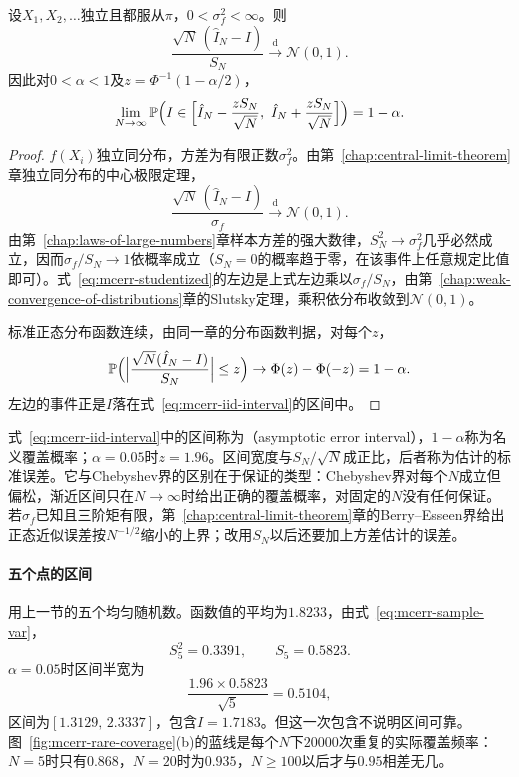 \begin{theorem}[独立样本的渐近误差区间]
\label{thm:mcerr-iid-clt}
设$X_1,X_2,\dots$独立且都服从$\pi$，$0<\sigma_f^{2}<\infty$。则
\begin{equation}
 \frac{\sqrt{N}\,(\hat{I}_N-I)}{S_N}\xrightarrow{\mathrm{d}}\mathcal{N}(0,1) .
 \label{eq:mcerr-studentized}
\end{equation}
因此对$0<\alpha<1$及$z=\Phi^{-1}(1-\alpha/2)$，
\begin{equation}
 \lim_{N\to\infty}\mathbb{P}\Bigl(I\in\Bigl[\hat{I}_N-\frac{zS_N}{\sqrt{N}},\ \hat{I}_N+\frac{zS_N}{\sqrt{N}}\Bigr]\Bigr)=1-\alpha .
 \label{eq:mcerr-iid-interval}
\end{equation}
\end{theorem}

\begin{proof}
$f(X_i)$独立同分布，方差为有限正数$\sigma_f^{2}$。由第~\ref{chap:central-limit-theorem}章独立同分布的中心极限定理，
\[
 \frac{\sqrt{N}\,(\hat{I}_N-I)}{\sigma_f}\xrightarrow{\mathrm{d}}\mathcal{N}(0,1) .
\]
由第~\ref{chap:laws-of-large-numbers}章样本方差的强大数律，$S_N^{2}\to\sigma_f^{2}$几乎必然成立，因而$\sigma_f/S_N\to1$依概率成立（$S_N=0$的概率趋于零，在该事件上任意规定比值即可）。式~\eqref{eq:mcerr-studentized}的左边是上式左边乘以$\sigma_f/S_N$，由第~\ref{chap:weak-convergence-of-distributions}章的Slutsky定理，乘积依分布收敛到$\mathcal{N}(0,1)$。

标准正态分布函数连续，由同一章的分布函数判据，对每个$z$，
\[
 \mathbb{P}\Bigl(\Bigl\lvert\frac{\sqrt{N}(\hat{I}_N-I)}{S_N}\Bigr\rvert\leq z\Bigr)\to\Phi(z)-\Phi(-z)=1-\alpha .
\]
左边的事件正是$I$落在式~\eqref{eq:mcerr-iid-interval}的区间中。
\end{proof}

式~\eqref{eq:mcerr-iid-interval}中的区间称为（asymptotic error interval），$1-\alpha$称为名义覆盖概率；$\alpha=0.05$时$z=1.96$。区间宽度与$S_N/\sqrt{N}$成正比，后者称为估计的标准误差。它与Chebyshev界的区别在于保证的类型：Chebyshev界对每个$N$成立但偏松，渐近区间只在$N\to\infty$时给出正确的覆盖概率，对固定的$N$没有任何保证。若$\sigma_f$已知且三阶矩有限，第~\ref{chap:central-limit-theorem}章的Berry--Esseen界给出正态近似误差按$N^{-1/2}$缩小的上界；改用$S_N$以后还要加上方差估计的误差。

\paragraph{五个点的区间}
用上一节的五个均匀随机数。函数值的平均为$1.8233$，由式~\eqref{eq:mcerr-sample-var}，
\[
 S_5^{2}=0.3391,\qquad S_5=0.5823 .
\]
$\alpha=0.05$时区间半宽为
\[
 \frac{1.96\times0.5823}{\sqrt5}=0.5104 ,
\]
区间为$[1.3129,\,2.3337]$，包含$I=1.7183$。但这一次包含不说明区间可靠。图~\ref{fig:mcerr-rare-coverage}(b)的蓝线是每个$N$下$20000$次重复的实际覆盖频率：$N=5$时只有$0.868$，$N=20$时为$0.935$，$N\geq100$以后才与$0.95$相差无几。

